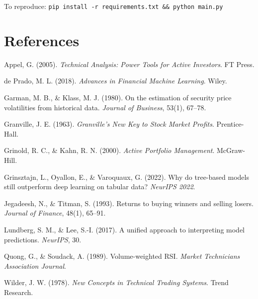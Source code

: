 \documentclass[12pt,a4paper]{article}
\begin{document}
To reproduce: \texttt{pip install -r requirements.txt \&\& python main.py}

\section*{References}
\begin{enumerate}[label={[\arabic*]}]
    \item Appel, G. (2005). \textit{Technical Analysis: Power Tools for Active Investors}. FT Press.
    \item de Prado, M. L. (2018). \textit{Advances in Financial Machine Learning}. Wiley.
    \item Garman, M. B., \& Klass, M. J. (1980). On the estimation of security price volatilities from historical data. \textit{Journal of Business}, 53(1), 67--78.
    \item Granville, J. E. (1963). \textit{Granville's New Key to Stock Market Profits}. Prentice-Hall.
    \item Grinold, R. C., \& Kahn, R. N. (2000). \textit{Active Portfolio Management}. McGraw-Hill.
    \item Grinsztajn, L., Oyallon, E., \& Varoquaux, G. (2022). Why do tree-based models still outperform deep learning on tabular data? \textit{NeurIPS 2022}.
    \item Jegadeesh, N., \& Titman, S. (1993). Returns to buying winners and selling losers. \textit{Journal of Finance}, 48(1), 65--91.
    \item Lundberg, S. M., \& Lee, S.-I. (2017). A unified approach to interpreting model predictions. \textit{NeurIPS}, 30.
    \item Quong, G., \& Soudack, A. (1989). Volume-weighted RSI. \textit{Market Technicians Association Journal}.
    \item Wilder, J. W. (1978). \textit{New Concepts in Technical Trading Systems}. Trend Research.
\end{enumerate}
\end{document}
